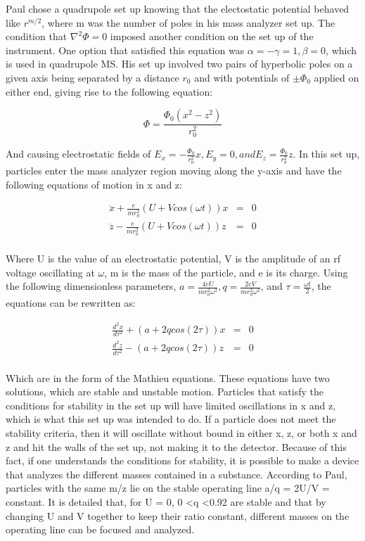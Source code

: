\documentclass[12pt]{amsart}
\begin{document}
Paul chose a quadrupole set up knowing that the electostatic potential behaved like $r^{m/2}$, where m was the number of poles in his mass analyzer set up. The condition that $\nabla^2 \Phi = 0$ imposed another condition on the set up of the instrument. One option that satisfied this equation was $\alpha = -\gamma = 1, \beta = 0$, which is used in quadrupole MS. His set up involved two pairs of hyperbolic poles on a given axis being separated by a distance $r_0$ and with potentials of $\pm \Phi_0$ applied on either end, giving rise to the following equation:

\begin{equation}
\Phi =\frac {\Phi_0(x^2-z^2)}{r_0^2}
\end{equation}

And causing electrostatic fields of $E_x = -\frac{\Phi_0}{r_0^2}x, E_y=0, and E_z = \frac{\Phi_0}{r_0^2}z$. In this set up, particles enter the mass analyzer region moving along the y-axis and have the following equations of motion in x and z:


\begin{eqnarray*}
\ddot{x} + \frac{e}{mr_0^2}(U+Vcos(\omega t))x &=& 0\\
\ddot{z} - \frac{e}{mr_0^2}(U+Vcos(\omega t))z &=& 0\\
\end{eqnarray*}

Where U is the value of an electrostatic potential, V is the amplitude of an rf voltage oscillating at $\omega$, m is the mass of the particle, and e is its charge. Using the following dimensionless parameters, $a= \frac{4eU}{mr_0^2\omega^2}, q = \frac{2eV}{mr_0^2\omega^2}$, and $\tau = \frac{\omega t}{2}$, the equations can be rewritten as:

\begin{eqnarray*}
\frac{d^2x}{d\tau^2} + (a+2qcos(2\tau))x &=& 0\\
\frac{d^2z}{d\tau^2} - (a+2qcos(2\tau))z&=& 0\\
\end{eqnarray*}

Which are in the form of the Mathieu equations. These equations have two solutions, which are stable and unstable motion. Particles that satisfy the conditions for stability in the set up will have limited oscillations in x and z, which is what this set up was intended to do. If a particle does not meet the stability criteria, then it will oscillate without bound in either x, z, or both x and z and hit the walls of the set up, not making it to the detector. Because of this fact, if one understands the conditions for stability, it is possible to make a device that analyzes the different masses contained in a substance. According to Paul, particles with the same m/z lie on the stable operating line a/q = 2U/V = constant. It is detailed that, for U = 0, 0 \textless q \textless 0.92 are stable and that by changing U and V together to keep their ratio constant, different masses on the operating line can be focused and analyzed.\\
\end{document}
